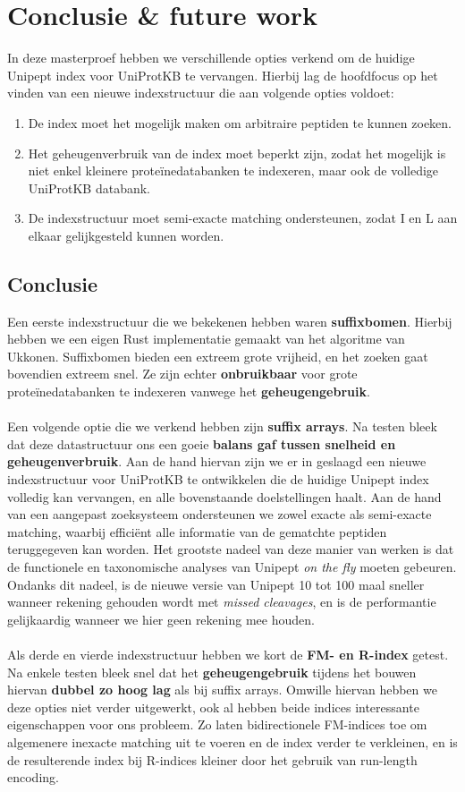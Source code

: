 \chapter{Conclusie \& future work}\label{ch:conclusie}
In deze masterproef hebben we verschillende opties verkend om de huidige Unipept index voor UniProtKB te vervangen.
Hierbij lag de hoofdfocus op het vinden van een nieuwe indexstructuur die aan volgende opties voldoet:
\begin{enumerate}
    \item De index moet het mogelijk maken om arbitraire peptiden te kunnen zoeken.
    \item Het geheugenverbruik van de index moet beperkt zijn, zodat het mogelijk is niet enkel kleinere proteïnedatabanken te indexeren, maar ook de volledige UniProtKB databank.
    \item De indexstructuur moet semi-exacte matching ondersteunen, zodat I en L aan elkaar gelijkgesteld kunnen worden.
\end{enumerate}

\section{Conclusie}
Een eerste indexstructuur die we bekekenen hebben waren \textbf{suffixbomen}.
Hierbij hebben we een eigen Rust implementatie gemaakt van het algoritme van Ukkonen.
Suffixbomen bieden een extreem grote vrijheid, en het zoeken gaat bovendien extreem snel.
Ze zijn echter \textbf{onbruikbaar} voor grote proteïnedatabanken te indexeren vanwege het \textbf{geheugengebruik}.
\\ \\
Een volgende optie die we verkend hebben zijn \textbf{suffix arrays}.
Na testen bleek dat deze datastructuur ons een goeie \textbf{balans gaf tussen snelheid en geheugenverbruik}.
Aan de hand hiervan zijn we er in geslaagd een nieuwe indexstructuur voor UniProtKB te ontwikkelen die de huidige Unipept index volledig kan vervangen, en alle bovenstaande doelstellingen haalt.
Aan de hand van een aangepast zoeksysteem ondersteunen we zowel exacte als semi-exacte matching, waarbij efficiënt alle informatie van de gematchte peptiden teruggegeven kan worden.
Het grootste nadeel van deze manier van werken is dat de functionele en taxonomische analyses van Unipept \textit{on the fly} moeten gebeuren.
Ondanks dit nadeel, is de nieuwe versie van Unipept 10 tot 100 maal sneller wanneer rekening gehouden wordt met \textit{missed cleavages}, en is de performantie gelijkaardig wanneer we hier geen rekening mee houden.
\\ \\
Als derde en vierde indexstructuur hebben we kort de \textbf{FM- en R-index} getest.
Na enkele testen bleek snel dat het \textbf{geheugengebruik} tijdens het bouwen hiervan \textbf{dubbel zo hoog lag} als bij suffix arrays.
Omwille hiervan hebben we deze opties niet verder uitgewerkt, ook al hebben beide indices interessante eigenschappen voor ons probleem.
Zo laten bidirectionele FM-indices toe om algemenere inexacte matching uit te voeren en de index verder te verkleinen, en is de resulterende index bij R-indices kleiner door het gebruik van run-length encoding.

